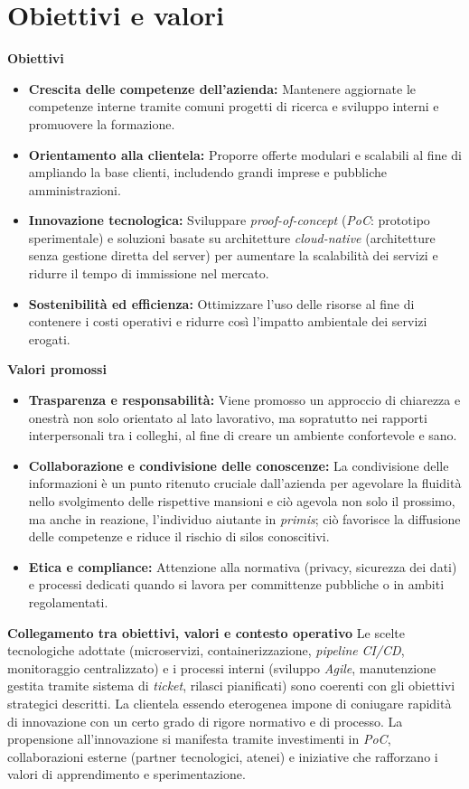 \section{Obiettivi e valori}

\medskip
\noindent\textbf{Obiettivi}
\begin{itemize}
  \item \textbf{Crescita delle competenze dell'azienda:} Mantenere aggiornate le competenze interne tramite comuni progetti di ricerca e sviluppo interni e promuovere la formazione.
  \item \textbf{Orientamento alla clientela:} Proporre offerte modulari e scalabili al fine di ampliando la base clienti, includendo grandi imprese e pubbliche amministrazioni.
  \item \textbf{Innovazione tecnologica:} Sviluppare \emph{proof-of-concept} (\emph{PoC}: prototipo sperimentale) e soluzioni basate su architetture \emph{cloud-native} (architetture senza gestione diretta del server) per aumentare la scalabilità dei servizi e ridurre il tempo di immissione nel mercato.
  \item \textbf{Sostenibilità ed efficienza:} Ottimizzare l'uso delle risorse al fine di contenere i costi operativi e ridurre così l'impatto ambientale dei servizi erogati.
\end{itemize}

\medskip
\noindent\textbf{Valori promossi}
\begin{itemize}
  \item \textbf{Trasparenza e responsabilità:} Viene promosso un approccio di chiarezza e onestrà non solo orientato al lato lavorativo, ma sopratutto nei rapporti interpersonali tra i colleghi, al fine di creare un ambiente confortevole e sano.
  \item \textbf{Collaborazione e condivisione delle conoscenze:} La condivisione delle informazioni è un punto ritenuto cruciale dall'azienda per agevolare la fluidità nello svolgimento delle rispettive mansioni e ciò agevola non solo il prossimo, ma anche in reazione, l'individuo aiutante in \emph{primis}; ciò favorisce la diffusione delle competenze e riduce il rischio di silos conoscitivi.
  \item \textbf{Etica e compliance:} Attenzione alla normativa (privacy, sicurezza dei dati) e processi dedicati quando si lavora per committenze pubbliche o in ambiti regolamentati.
\end{itemize}

\medskip
\noindent\textbf{Collegamento tra obiettivi, valori e contesto operativo} Le scelte tecnologiche adottate 
(microservizi, containerizzazione, \emph{pipeline} \emph{CI/CD}, monitoraggio centralizzato) e i processi interni 
(sviluppo \emph{Agile}, manutenzione gestita tramite sistema di \emph{ticket}, rilasci pianificati) sono coerenti con gli obiettivi strategici descritti. 
La clientela essendo eterogenea impone di coniugare rapidità di innovazione con un certo grado di rigore normativo e di processo.
La propensione all'innovazione si manifesta tramite investimenti in \emph{PoC}, collaborazioni esterne (partner tecnologici, atenei) 
e iniziative che rafforzano i valori di apprendimento e sperimentazione.


